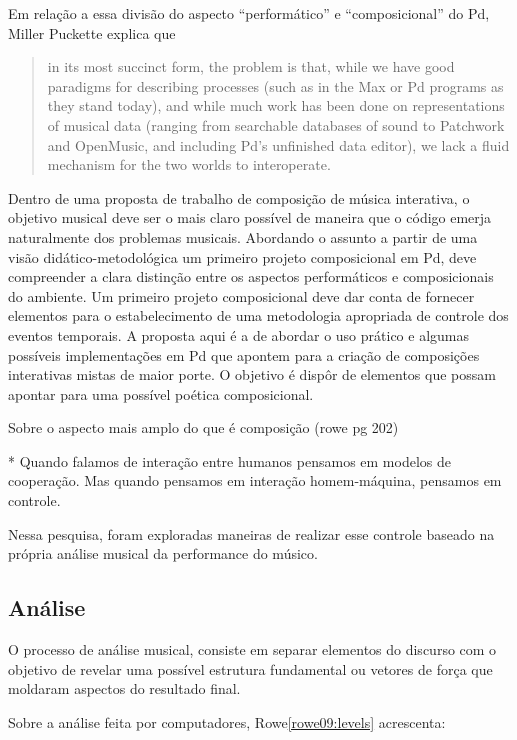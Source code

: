 \documentclass{ppgmus}
\begin{document}
Em relação a essa divisão do aspecto ``performático'' e
``composicional'' do Pd, Miller Puckette explica que

\begin{quote}
  in its most succinct form, the problem is that, while we have good
  paradigms for describing processes (such as in the Max or Pd
  programs as they stand today), and while much work has been done on
  representations of musical data (ranging from searchable databases
  of sound to Patchwork and OpenMusic, and including Pd's unfinished
  data editor), we lack a fluid mechanism for the two worlds to
  interoperate. \cite{puckette04:divide}
\end{quote}

Dentro de uma proposta de trabalho de composição de música interativa,
o objetivo musical deve ser o mais claro possível de maneira que o
código emerja naturalmente dos problemas musicais. Abordando o assunto
a partir de uma visão didático-metodológica um primeiro projeto
composicional em Pd, deve compreender a clara distinção entre os
aspectos performáticos e composicionais do ambiente. Um primeiro
projeto composicional deve dar conta de fornecer elementos para o
estabelecimento de uma metodologia apropriada de controle dos eventos
temporais. A proposta aqui é a de abordar o uso prático e algumas
possíveis implementações em Pd que apontem para a criação de
composições interativas mistas de maior porte. O objetivo é dispôr de
elementos que possam apontar para uma possível poética composicional.

Sobre o aspecto mais amplo do que é composição (rowe pg 202)
 

* Quando falamos de interação entre humanos pensamos em modelos
de cooperação. Mas quando pensamos em interação homem-máquina, 
pensamos em controle. 

Nessa pesquisa, foram exploradas maneiras de
realizar esse controle baseado na própria análise musical da
performance do músico.


\subsection{Análise}
\label{analise-geral}


O processo de análise musical, consiste em separar elementos
do discurso com o objetivo de revelar uma possível estrutura fundamental
ou vetores de força que moldaram aspectos do resultado final.

Sobre a análise feita por computadores, Rowe\ref{rowe09:levels}
acrescenta:
\end{document}
